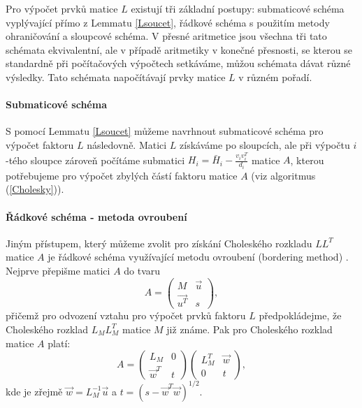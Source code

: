 \documentclass[11pt,american,czech,oneside]{book}
\theoremstyle{plain}
\theoremstyle{definition}
\begin{document}
Pro výpočet prvků matice $L$ existují tři základní postupy: submaticové schéma vyplývající přímo z Lemmatu \ref{Lsoucet}, řádkové schéma s použitím metody ohraničování a sloupcové schéma. V přesné aritmetice jsou všechna tři tato schémata ekvivalentní, ale v případě aritmetiky v konečné přesnosti, se kterou se standardně při počítačových výpočtech setkáváme, můžou schémata dávat různé výsledky. Tato schémata napočítávají prvky matice $L$ v různém pořadí.

\paragraph{Submaticové schéma}
S pomocí Lemmatu \ref{Lsoucet} můžeme navrhnout submaticové schéma pro výpočet faktoru $L$ následovně. Matici $L$ získáváme po sloupcích, ale při výpočtu $i$-tého sloupce zároveň počítáme submatici $H_i = \bar{H}_i-\frac{v_i v_i^T}{d_i}$ matice $A$, kterou potřebujeme pro výpočet zbylých částí faktoru matice $A$ (viz algoritmus (\ref{Cholesky})).

\paragraph{Řádkové schéma - metoda ovroubení}
Jiným přístupem, který můžeme zvolit pro získání Choleského rozkladu $L L^T$ matice $A$ je řádkové schéma využívající metodu ovroubení (bordering method) \cite{fad:59, ort:88}. Nejprve přepišme matici $A$ do tvaru
\[
A =
\begin{pmatrix}
  M & \vec{u} \\
  \vec{u^T} & s
\end{pmatrix},
\]
přičemž pro odvození vztahu pro výpočet prvků faktoru $L$ předpokládejme, že Choleského rozklad $L_M L_M^T$ matice $M$ již známe. Pak pro Choleského rozklad matice $A$ platí:
\[
A =
\begin{pmatrix}
  L_M & 0 \\
  \vec{w}^T & t
\end{pmatrix}
\begin{pmatrix}
  L_M^T & \vec{w} \\
  0 & t
\end{pmatrix},
\]
kde je zřejmě $\vec{w}=L_M^{-1}\vec{u}$ a $t=(s-\vec{w}^T\vec{w})^{1/2}$.
\end{document}
